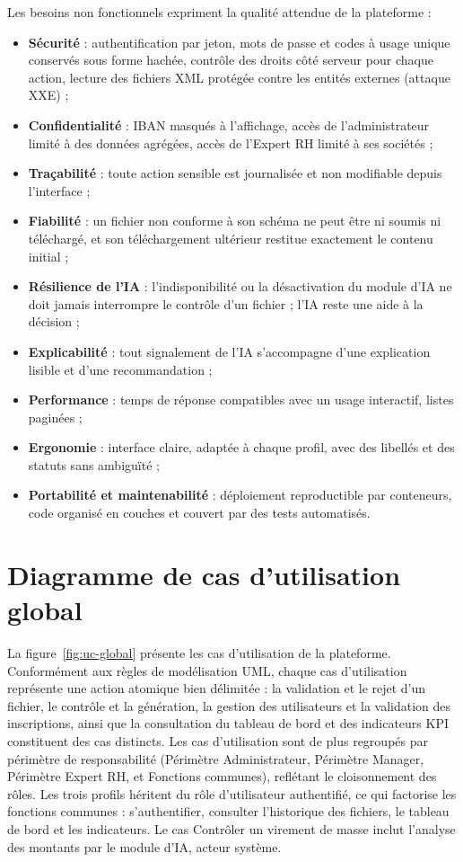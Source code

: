 Les besoins non fonctionnels expriment la qualité attendue de la plateforme :
\begin{itemize}
    \item \textbf{Sécurité} : authentification par jeton, mots de passe et codes à usage unique conservés sous forme hachée, contrôle des droits côté serveur pour chaque action, lecture des fichiers XML protégée contre les entités externes (attaque XXE) ;
    \item \textbf{Confidentialité} : IBAN masqués à l'affichage, accès de l'administrateur limité à des données agrégées, accès de l'Expert RH limité à ses sociétés ;
    \item \textbf{Traçabilité} : toute action sensible est journalisée et non modifiable depuis l'interface ;
    \item \textbf{Fiabilité} : un fichier non conforme à son schéma ne peut être ni soumis ni téléchargé, et son téléchargement ultérieur restitue exactement le contenu initial ;
    \item \textbf{Résilience de l'IA} : l'indisponibilité ou la désactivation du module d'IA ne doit jamais interrompre le contrôle d'un fichier ; l'IA reste une aide à la décision ;
    \item \textbf{Explicabilité} : tout signalement de l'IA s'accompagne d'une explication lisible et d'une recommandation ;
    \item \textbf{Performance} : temps de réponse compatibles avec un usage interactif, listes paginées ;
    \item \textbf{Ergonomie} : interface claire, adaptée à chaque profil, avec des libellés et des statuts sans ambiguïté ;
    \item \textbf{Portabilité et maintenabilité} : déploiement reproductible par conteneurs, code organisé en couches et couvert par des tests automatisés.
\end{itemize}

\section{Diagramme de cas d'utilisation global}

La figure~\ref{fig:uc-global} présente les cas d'utilisation de la plateforme. Conformément aux règles de modélisation UML, chaque cas d'utilisation représente une action atomique bien délimitée : la validation et le rejet d'un fichier, le contrôle et la génération, la gestion des utilisateurs et la validation des inscriptions, ainsi que la consultation du tableau de bord et des indicateurs KPI constituent des cas distincts. Les cas d'utilisation sont de plus regroupés par périmètre de responsabilité (Périmètre Administrateur, Périmètre Manager, Périmètre Expert RH, et Fonctions communes), reflétant le cloisonnement des rôles. Les trois profils héritent du rôle d'utilisateur authentifié, ce qui factorise les fonctions communes : s'authentifier, consulter l'historique des fichiers, le tableau de bord et les indicateurs. Le cas \og Contrôler un virement de masse\fg{} inclut l'analyse des montants par le module d'IA, acteur système.

